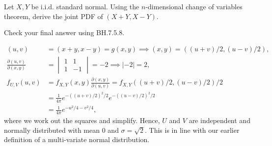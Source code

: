 \documentclass[assignments]{subfiles}
\begin{document}
\begin{exercise}
Let $X, Y$ be i.i.d. standard normal. Using the $n$-dimensional change of variables theorem, derive the joint PDF of $(X+Y, X-Y)$.

Check your final answer using BH.7.5.8.
\begin{solution}
\begin{align}
(u,v) &= (x+y, x-y) = g(x,y) \implies (x,y) = ((u+v)/2, (u-v)/2), \\
\frac{\partial (u,v)}{\partial (x, y)} &=
  \begin{vmatrix}
    1 & 1 \\
1 & -1
  \end{vmatrix} = -2 \implies |-2| = 2,\\
f_{U,V}(u,v) &= f_{X,Y}(x,y) \frac{\partial(x,y)}{\partial(u,v)} = f_{X,Y}((u+v)/2, (u-v)/2) /2 \\
&= \frac{1}{4\pi} e^{-((u+v)/2)^{2}/2} e^{-((u-v)/2)^{2}/2} \\
&= \frac{1}{4\pi} e^{-u^{2}/4-v^{2}/4},
\end{align}
where we work out the squares and simplify.
Hence, $U$ and $V$ are independent and normally distributed with mean 0 and $\sigma=\sqrt 2$.
This is in line with our earlier definition of a multi-variate normal distribution.
\end{solution}

\end{exercise}
\end{document}
